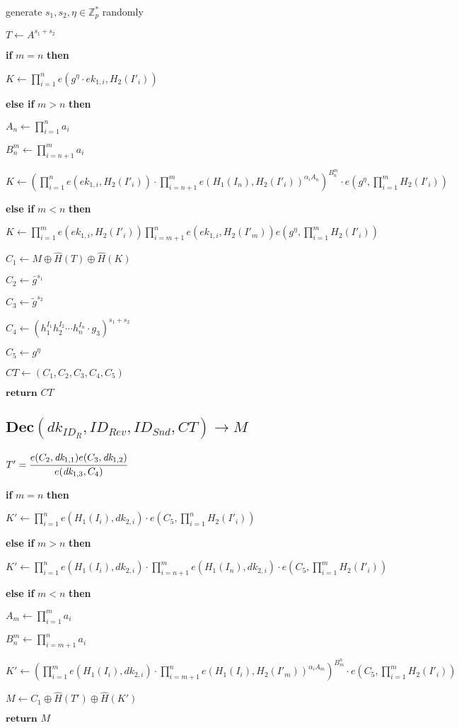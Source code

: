 \documentclass[a4paper]{article}
\begin{document}
generate $s_1, s_2, \eta \in \mathbb{Z}_p^*$ randomly

$T \gets A^{s_1 + s_2}$

\textbf{if} $m = n$ \textbf{then}

\quad$K \gets \prod_{i = 1}^n e(g^{\eta} \cdot \textit{ek}_{1, i}, H_2(I'_i))$

\textbf{else if} $m > n$ \textbf{then}

\quad$A_n \gets \prod\limits_{i = 1}^n a_i$

\quad$B_n^m \gets \prod\limits_{i = n + 1}^m a_i$

\quad$K \gets
(
\prod\limits_{i = 1}^n e(\textit{ek}_{1, i}, H_2(I'_i))
\cdot \prod\limits_{i = n + 1}^m e(H_1(I_n), H_2(I'_i))^{\alpha_i A_n}
)^{B_n^m}
\cdot e(g^{\eta}, \prod\limits_{i = 1}^m H_2(I'_i))
$

\textbf{else if} $m < n$ \textbf{then}

\quad$K \gets
\prod\limits_{i = 1}^m e(\textit{ek}_{1, i}, H_2(I'_i))
\prod\limits_{i = m + 1}^n e(\textit{ek}_{1, i}, H_2(I'_m))
e(g^{\eta}, \prod\limits_{i = 1}^m H_2(I'_i))
$

$C_1 \gets M \oplus \hat{H}(T) \oplus \hat{H}(K)$

$C_2 \gets \bar{g}^{s_1}$

$C_3 \gets \tilde{g}^{s_2}$

$C_4 \gets (h_1^{I_1} h_2^{I_2} \cdots h_n^{I_n} \cdot g_3)^{s_1 + s_2}$

$C_5 \gets g^{\eta}$

$\textit{CT} \gets (C_1, C_2, C_3, C_4, C_5)$

$\textbf{return }\textit{CT}$

\subsection{$\textbf{Dec}(\textit{dk}_{\textit{ID}_R}, \textit{ID}_\textit{Rev}, \textit{ID}_\textit{Snd}, \textit{CT}) \rightarrow M$}

$T' = \cfrac{e(C_2, \textit{dk}_{1, 1})e(C_3, \textit{dk}_{1, 2})}{e(\textit{dk}_{1, 3}, C_4)}$

\textbf{if} $m = n$ \textbf{then}

\quad$K' \gets
\prod\limits_{i = 1}^n e(H_1(I_i), \textit{dk}_{2, i}) 
\cdot e(C_5, \prod\limits_{i = 1}^n H_2(I'_i))
$

\textbf{else if} $m > n$ \textbf{then}

\quad$K' \gets
\prod\limits_{i = 1}^n e(H_1(I_i), \textit{dk}_{2, i})
\cdot \prod\limits_{i = n + 1}^m e(H_1(I_n), \textit{dk}_{2, i})
\cdot e(C_5, \prod\limits_{i = 1}^m H_2(I'_i))
$

\textbf{else if} $m < n$ \textbf{then}

\quad$A_m \gets \prod\limits_{i = 1}^m a_i$

\quad$B_n^m \gets \prod\limits_{i = m + 1}^n a_i$

\quad$K' \gets
(
\prod\limits_{i = 1}^m e(H_1(I_i), \textit{dk}_{2, i})
\cdot \prod\limits_{i = m + 1}^n e(H_1(I_i), H_2(I'_m))^{\alpha_i A_m}
)^{B_m^n}
\cdot e(C_5, \prod\limits_{i = 1}^m H_2(I'_i))
$

$M \gets C_1 \oplus \hat{H}(T') \oplus \hat{H}(K')$

$\textbf{return }M$
\end{document}
